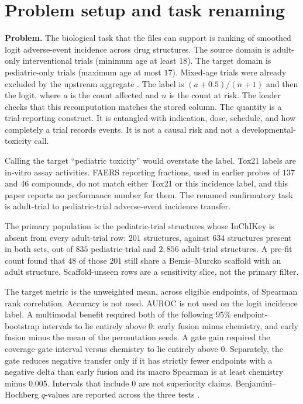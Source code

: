 \documentclass{article}
\begin{document}
\section{Problem setup and task renaming}
\label{sec:problem}

\textbf{Problem.}
The biological task that the files can support is ranking of smoothed logit adverse-event incidence across drug structures.
The source domain is adult-only interventional trials (minimum age at least $18$).
The target domain is pediatric-only trials (maximum age at most $17$).
Mixed-age trials were already excluded by the upstream aggregate \citep{clinicaltrials}.
The label is $(a+0.5)/(n+1)$ and then the logit, where $a$ is the count affected and $n$ is the count at risk.
The loader checks that this recomputation matches the stored column.
The quantity is a trial-reporting construct.
It is entangled with indication, dose, schedule, and how completely a trial records events.
It is not a causal risk and not a developmental-toxicity call.

Calling the target ``pediatric toxicity'' would overstate the label.
Tox21 labels are in-vitro assay activities.
FAERS reporting fractions, used in earlier probes of $137$ and $46$ compounds, do not match either Tox21 or this incidence label, and this paper reports no performance number for them.
The renamed confirmatory task is adult-trial to pediatric-trial adverse-event incidence transfer.

The primary population is the pediatric-trial structures whose InChIKey \citep{heller2015inchi} is absent from every adult-trial row: $201$ structures, against $634$ structures present in both sets, out of $835$ pediatric-trial and $2{,}856$ adult-trial structures.
A pre-fit count found that $48$ of those $201$ still share a Bemis--Murcko scaffold with an adult structure.
Scaffold-unseen rows are a sensitivity slice, not the primary filter.

The target metric is the unweighted mean, across eligible endpoints, of Spearman rank correlation.
Accuracy is not used.
AUROC is not used on the logit incidence label.
A multimodal benefit required both of the following $95\%$ endpoint-bootstrap intervals to lie entirely above $0$: early fusion minus chemistry, and early fusion minus the mean of the permutation seeds.
A gate gain required the coverage-gate interval versus chemistry to lie entirely above $0$.
Separately, the gate reduces negative transfer only if it has strictly fewer endpoints with a negative delta than early fusion and its macro Spearman is at least chemistry minus $0.005$.
Intervals that include $0$ are not superiority claims.
Benjamini--Hochberg $q$-values are reported across the three tests \citep{benjamini1995fdr}.
\end{document}
